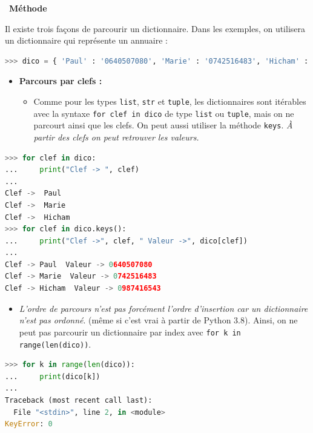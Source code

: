 \documentclass[
  11pt,
]{article}
\newcommand{\passthrough}[1]{#1}
\providecommand{\tightlist}{%
  \setlength{\itemsep}{0pt}\setlength{\parskip}{0pt}}
\newcounter{cours}
\newenvironment{methode}[1]
{\par \medskip    \noindent  
 \begin {bclogo}[arrondi =0.1,logo=\bcoutil, marge=4,noborder = true] {~\textbf{Méthode}   {\itshape #1} }  \par}
{
\end{bclogo}
 \par \bigskip }
\begin{document}
\begin{methode}{}

Il existe trois façons de parcourir un dictionnaire. Dans les exemples,
on utilisera un dictionnaire qui représente un annuaire :

\begin{lstlisting}[language=Python]
>>> dico = { 'Paul' : '0640507080', 'Marie' : '0742516483', 'Hicham' : '0987416543'}
\end{lstlisting}

\begin{itemize}
\item
  \textbf{Parcours par clefs :}

  \begin{itemize}
  \tightlist
  \item
    Comme pour les types \passthrough{\lstinline!list!},
    \passthrough{\lstinline!str!} et \passthrough{\lstinline!tuple!},
    les dictionnaires sont itérables avec la syntaxe
    \passthrough{\lstinline!for clef in dico!} de type
    \passthrough{\lstinline!list!} ou \passthrough{\lstinline!tuple!},
    mais on ne parcourt ainsi que les clefs. On peut aussi utiliser la
    méthode \passthrough{\lstinline!keys!}. \emph{À partir des clefs on
    peut retrouver les valeurs.}
  \end{itemize}
\end{itemize}

\begin{lstlisting}[language=Python]
>>> for clef in dico:
...     print("Clef -> ", clef)
... 
Clef ->  Paul
Clef ->  Marie
Clef ->  Hicham
>>> for clef in dico.keys():
...     print("Clef ->", clef, " Valeur ->", dico[clef])
... 
Clef -> Paul  Valeur -> 0640507080
Clef -> Marie  Valeur -> 0742516483
Clef -> Hicham  Valeur -> 0987416543
\end{lstlisting}

\begin{itemize}
\tightlist
\item
  \emph{L'ordre de parcours n'est pas forcément l'ordre d'insertion car
  un dictionnaire n'est pas ordonné}. (même si c'est vrai à partir de
  Python 3.8). Ainsi, on ne peut pas parcourir un dictionnaire par index
  avec \passthrough{\lstinline!for k in range(len(dico))!}.
\end{itemize}

\begin{lstlisting}[language=Python]
>>> for k in range(len(dico)):
...     print(dico[k])
... 
Traceback (most recent call last):
  File "<stdin>", line 2, in <module>
KeyError: 0
\end{lstlisting}


\end{methode}
\end{document}
